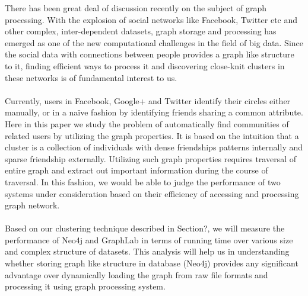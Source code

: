 \documentclass[11pt,onecolumn]{article}
\begin{document}
There has been great deal of discussion recently on the subject of graph processing. With the explosion of social networks like Facebook, Twitter etc and other complex, inter-dependent datasets, graph storage and processing has emerged as one of the new computational challenges in the field of big data. Since the social data with connections between people provides a graph like structure to it, finding efficient ways to process it and discovering close-knit clusters in these networks is of fundamental interest to us.
\\\\
Currently, users in Facebook, Google+ and Twitter identify their circles either manually, or in a naïve fashion by identifying friends sharing a common attribute. Here in this paper we study the problem of automatically find communities of related users by utilizing the graph properties. It is based on the intuition that a cluster is a collection of individuals with dense friendships patterns internally and sparse friendship externally. Utilizing such graph properties requires traversal of entire graph and extract out important information during the course of traversal. In this fashion, we would be able to judge the performance of two systems under consideration based on their efficiency of accessing and processing graph network. 
\\\\
Based on our clustering technique described in Section?, we will measure the performance of Neo4j and GraphLab in terms of running time over various size and complex structure of datasets. This analysis will help us in understanding whether storing graph like structure in database (Neo4j) provides any significant advantage over dynamically loading the graph from raw file formats and processing it using graph processing system.
\end{document}
